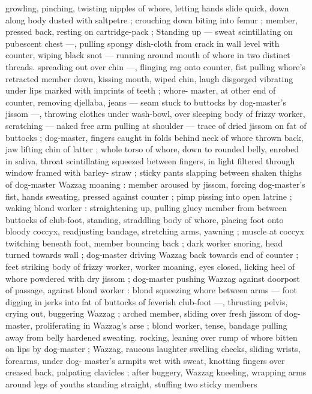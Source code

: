 growling, pinching, twisting nipples of whore, letting hands slide 
quick, down along body dusted with saltpetre ; crouching down 
biting into femur ; member, pressed back, resting on cartridge-pack 
; Standing up --- sweat scintillating on pubescent chest ---, pulling 
spongy dish-cloth from crack in wall level with counter, wiping black 
snot --- running around mouth of whore in two distinct threads. 
spreading out over chin ---, flinging rag onto counter, fist pulling 
whore's retracted member down, kissing mouth, wiped chin, laugh 
disgorged vibrating under lips marked with imprints of teeth ; whore- 
master, at other end of counter, removing djellaba, jeans --- seam 
stuck to buttocks by dog-master's jissom ---, throwing clothes under 
wash-bowl, over sleeping body of frizzy worker, scratching --- naked 
free arm pulling at shoulder --- trace of dried jissom on fat of 
buttocks ; dog-master, fingers caught in folds behind neck of whore 
thrown back, jaw lifting chin of latter ; whole torso of whore, down to 
rounded belly, enrobed in saliva, throat scintillating squeezed 
between fingers, in light filtered through window framed with barley- 
straw ; sticky pants slapping between shaken thighs of dog-master 
Wazzag moaning : member aroused by jissom, forcing dog-master's 
fist, hands sweating, pressed against counter ; pimp pissing into 
open latrine ; waking blond worker : straightening up, pulling gluey 
member from between buttocks of club-foot, standing, straddling 
body of whore, placing foot onto bloody coccyx, readjusting 
bandage, stretching arms, yawning ; muscle at coccyx twitching 
beneath foot, member bouncing back ; dark worker snoring, head 
turned towards wall ; dog-master driving Wazzag back towards end 
of counter ; feet striking body of frizzy worker, worker moaning, eyes 
closed, licking heel of whore powdered with dry jissom ; dog-master 
pushing Wazzag against doorpost of passage, against blond worker 
: blond squeezing whore between arms --- foot digging in jerks into 
fat of buttocks of feverish club-foot ---, thrusting pelvis, crying out, 
buggering Wazzag ; arched member, sliding over fresh jissom of dog- 
master, proliferating in Wazzag's arse ; blond worker, tense, bandage 
pulling away from belly hardened sweating. rocking, leaning over 
rump of whore bitten on lips by dog-master ; Wazzag, raucous 
laughter swelling cheeks, sliding wrists, forearms, under dog- 
master's armpits wet with sweat, knotting fingers over creased back, 
palpating clavicles ; after buggery, Wazzag kneeling, wrapping arms 
around legs of youths standing straight, stuffing two sticky members 
